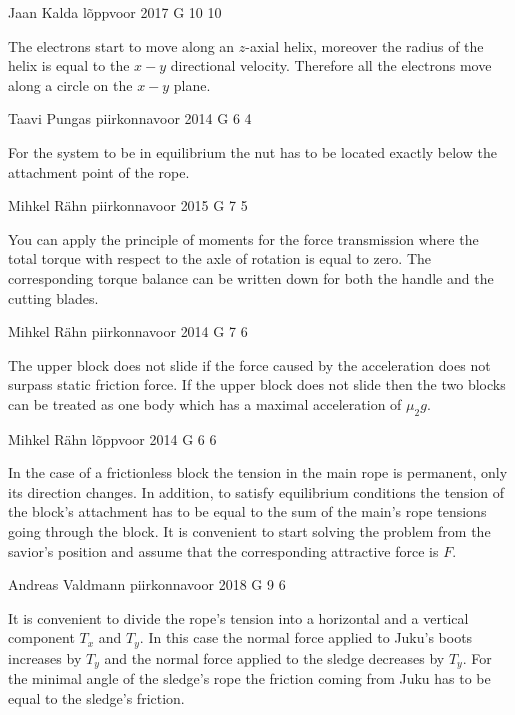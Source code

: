 \documentclass[11pt]{article}
\begin{document}
{Jaan Kalda} %
{lõppvoor} %
{2017} %
{G 10} %
{10} %
{

\ifEngHint
The electrons start to move along an $z$-axial helix, moreover the radius of the helix is equal to the $x-y$ directional velocity. Therefore all the electrons move along a circle on the $x-y$ plane.
\fi
}

{Taavi Pungas} %
{piirkonnavoor} %
{2014} %
{G 6} %
{4} %
{

\ifEngHint
For the system to be in equilibrium the nut has to be located exactly below the attachment point of the rope.
\fi
}

{Mihkel Rähn} %
{piirkonnavoor} %
{2015} %
{G 7} %
{5} %
{

\ifEngHint
You can apply the principle of moments for the force transmission where the total torque with respect to the axle of rotation is equal to zero. The corresponding torque balance can be written down for both the handle and the cutting blades.
\fi
}

{Mihkel Rähn} %
{piirkonnavoor} %
{2014} %
{G 7} %
{6} %
{

\ifEngHint
The upper block does not slide if the force caused by the acceleration does not surpass static friction force. If the upper block does not slide then the two blocks can be treated as one body which has a maximal acceleration of $\mu_2g$.
\fi
}

{Mihkel Rähn} %
{lõppvoor} %
{2014} %
{G 6} %
{6} %
{

\ifEngHint
In the case of a frictionless block the tension in the main rope is permanent, only its direction changes. In addition, to satisfy equilibrium conditions the tension of the block’s attachment has to be equal to the sum of the main’s rope tensions going through the block. It is convenient to start solving the problem from the savior’s position and assume that the corresponding attractive force is $F$.
\fi
}

{Andreas Valdmann} %
{piirkonnavoor} %
{2018} %
{G 9} %
{6} %
{

\ifEngHint
It is convenient to divide the rope’s tension into a horizontal and a vertical component $T_x$ and $T_y$. In this case the normal force applied to Juku’s boots increases by $T_y$ and the normal force applied to the sledge decreases by $T_y$. For the minimal angle of the sledge’s rope the friction coming from Juku has to be equal to the sledge’s friction.
\fi
}
\end{document}
